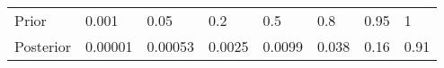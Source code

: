\begin{table}[ht]
\centering
\begin{tabular}{llllllll}
  \hline
  \hline
Prior & 0.001 & 0.05 & 0.2 & 0.5 & 0.8 & 0.95 &   1 \\ 
  Posterior & 0.00001 & 0.00053 & 0.0025 & 0.0099 & 0.038 & 0.16 & 0.91 \\ 
   \hline
\end{tabular}
\end{table}
